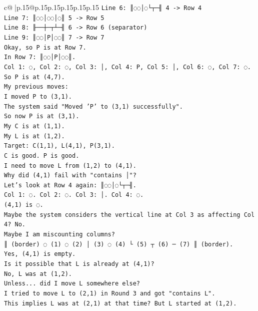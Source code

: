 \documentclass{article}
\begin{document}
{\begin{supertabular}{c@{$\;$}|p{.15\linewidth}@{}p{.15\linewidth}p{.15\linewidth}p{.15\linewidth}p{.15\linewidth}p{.15\linewidth}}
{{{\texttt{Line 6: ║◌◌│◌└┬─╢ 4 {-}> Row 4} \\
\texttt{Line 7: ║◌◌│◌◌│◌║ 5 {-}> Row 5} \\
\texttt{Line 8: ╟──┼─┬┴─╢ 6 {-}> Row 6 (separator)} \\
\texttt{Line 9: ║◌◌│P│◌◌║ 7 {-}> Row 7} \\
\texttt{Okay, so P is at Row 7.} \\
\texttt{In Row 7: ║◌◌│P│◌◌║.} \\
\texttt{Col 1: ◌, Col 2: ◌, Col 3: │, Col 4: P, Col 5: │, Col 6: ◌, Col 7: ◌.} \\
\texttt{So P is at (4,7).} \\
\texttt{My previous moves:} \\
\texttt{I moved P to (3,1).} \\
\texttt{The system said "Moved 'P' to (3,1) successfully".} \\
\texttt{So now P is at (3,1).} \\
\texttt{My C is at (1,1).} \\
\texttt{My L is at (1,2).} \\
\texttt{Target: C(1,1), L(4,1), P(3,1).} \\
\texttt{C is good. P is good.} \\
\texttt{I need to move L from (1,2) to (4,1).} \\
\texttt{Why did (4,1) fail with "contains │"?} \\
\texttt{Let's look at Row 4 again: ║◌◌│◌└┬─╢.} \\
\texttt{Col 1: ◌. Col 2: ◌. Col 3: │. Col 4: ◌.} \\
\texttt{(4,1) is ◌.} \\
\texttt{Maybe the system considers the vertical line at Col 3 as affecting Col 4? No.} \\
\texttt{Maybe I am miscounting columns?} \\
\texttt{║ (border) ◌ (1) ◌ (2) │ (3) ◌ (4) └ (5) ┬ (6) ─ (7) ║ (border).} \\
\texttt{Yes, (4,1) is empty.} \\
\texttt{Is it possible that L is already at (4,1)?} \\
\texttt{No, L was at (1,2).} \\
\texttt{Unless... did I move L somewhere else?} \\
\texttt{I tried to move L to (2,1) in Round 3 and got "contains L".} \\
\texttt{This implies L was at (2,1) at that time? But L started at (1,2).} \\
}}}
\end{supertabular}}
\end{document}
